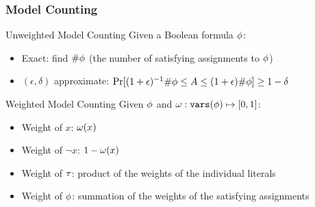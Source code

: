 \begin{frame}
    \frametitle{Model Counting}
    \begin{block}{Unweighted Model Counting}
        Given a Boolean formula $\phi$:
        \pause
        \begin{itemize}
            \item Exact: find $\#\phi$ (the number of satisfying assignments to $\phi$)
                  \pause
            \item $(\epsilon,\delta)$ approximate: $\Pr[(1+\epsilon)^{-1}\#\phi \leq A \leq (1+\epsilon)\#\phi] \geq 1-\delta$
        \end{itemize}
    \end{block}
    \pause
    \begin{block}{Weighted Model Counting}
        Given $\phi$ and $\omega:\texttt{vars}(\phi)\mapsto[0,1]$:
        \pause
        \begin{itemize}
            \item Weight of $x$: $\omega(x)$
                  \pause
            \item Weight of $\lnot x$: $1-\omega(x)$
                  \pause
            \item Weight of $\tau$: product of the weights of the individual literals
                  \pause
            \item Weight of $\phi$: summation of the weights of the satisfying assignments
        \end{itemize}
    \end{block}
\end{frame}
